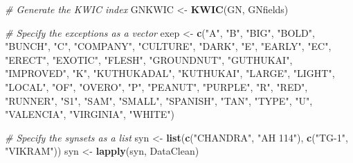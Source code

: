 \documentclass[]{article}
\newenvironment{Shaded}{\begin{snugshade}}{\end{snugshade}}
\newcommand{\CommentTok}[1]{\textcolor[rgb]{0.56,0.35,0.01}{\textit{#1}}}
\newcommand{\KeywordTok}[1]{\textcolor[rgb]{0.13,0.29,0.53}{\textbf{#1}}}
\newcommand{\NormalTok}[1]{#1}
\newcommand{\StringTok}[1]{\textcolor[rgb]{0.31,0.60,0.02}{#1}}
\begin{document}
\begin{Shaded}
\begin{Highlighting}[]
\CommentTok{# Generate the KWIC index}
\NormalTok{GNKWIC <-}\StringTok{ }\KeywordTok{KWIC}\NormalTok{(GN, GNfields)}

\CommentTok{# Specify the exceptions as a vector}
\NormalTok{exep <-}\StringTok{ }\KeywordTok{c}\NormalTok{(}\StringTok{"A"}\NormalTok{, }\StringTok{"B"}\NormalTok{, }\StringTok{"BIG"}\NormalTok{, }\StringTok{"BOLD"}\NormalTok{, }\StringTok{"BUNCH"}\NormalTok{, }\StringTok{"C"}\NormalTok{, }\StringTok{"COMPANY"}\NormalTok{, }\StringTok{"CULTURE"}\NormalTok{, }\StringTok{"DARK"}\NormalTok{,}
          \StringTok{"E"}\NormalTok{, }\StringTok{"EARLY"}\NormalTok{, }\StringTok{"EC"}\NormalTok{, }\StringTok{"ERECT"}\NormalTok{, }\StringTok{"EXOTIC"}\NormalTok{, }\StringTok{"FLESH"}\NormalTok{, }\StringTok{"GROUNDNUT"}\NormalTok{, }\StringTok{"GUTHUKAI"}\NormalTok{,}
          \StringTok{"IMPROVED"}\NormalTok{, }\StringTok{"K"}\NormalTok{, }\StringTok{"KUTHUKADAL"}\NormalTok{, }\StringTok{"KUTHUKAI"}\NormalTok{, }\StringTok{"LARGE"}\NormalTok{, }\StringTok{"LIGHT"}\NormalTok{, }\StringTok{"LOCAL"}\NormalTok{,}
          \StringTok{"OF"}\NormalTok{, }\StringTok{"OVERO"}\NormalTok{, }\StringTok{"P"}\NormalTok{, }\StringTok{"PEANUT"}\NormalTok{, }\StringTok{"PURPLE"}\NormalTok{, }\StringTok{"R"}\NormalTok{, }\StringTok{"RED"}\NormalTok{, }\StringTok{"RUNNER"}\NormalTok{, }\StringTok{"S1"}\NormalTok{, }\StringTok{"SAM"}\NormalTok{,}
          \StringTok{"SMALL"}\NormalTok{, }\StringTok{"SPANISH"}\NormalTok{, }\StringTok{"TAN"}\NormalTok{, }\StringTok{"TYPE"}\NormalTok{, }\StringTok{"U"}\NormalTok{, }\StringTok{"VALENCIA"}\NormalTok{, }\StringTok{"VIRGINIA"}\NormalTok{, }\StringTok{"WHITE"}\NormalTok{)}

\CommentTok{# Specify the synsets as a list}
\NormalTok{syn <-}\StringTok{ }\KeywordTok{list}\NormalTok{(}\KeywordTok{c}\NormalTok{(}\StringTok{"CHANDRA"}\NormalTok{, }\StringTok{"AH 114"}\NormalTok{), }\KeywordTok{c}\NormalTok{(}\StringTok{"TG-1"}\NormalTok{, }\StringTok{"VIKRAM"}\NormalTok{))}
\NormalTok{syn <-}\StringTok{ }\KeywordTok{lapply}\NormalTok{(syn, DataClean)}
\end{Highlighting}
\end{Shaded}
\end{document}
